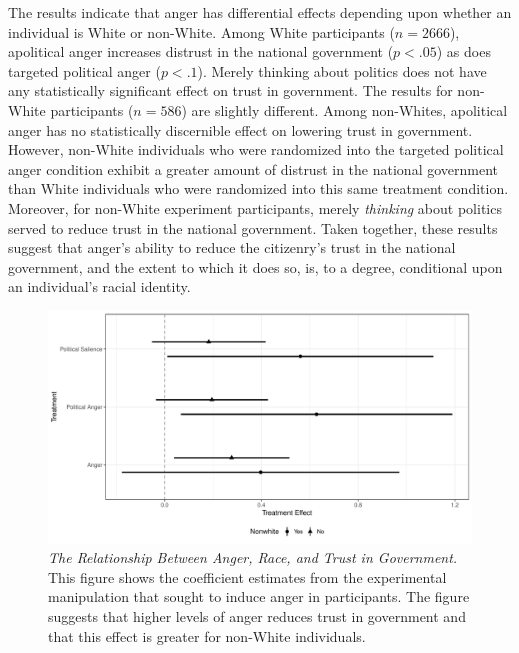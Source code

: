 \documentclass[12pt, letterpaper]{article}
\begin{document}
The results indicate that anger has differential effects depending upon whether an individual is White or non-White. Among White participants ($n=2666$), apolitical anger increases distrust in the national government ($p < .05$) as does targeted political anger ($p < .1$). Merely thinking about politics does not have any statistically significant effect on trust in government. The results for non-White participants ($n=586$) are slightly different. Among non-Whites, apolitical anger has no statistically discernible effect on lowering trust in government. However, non-White individuals who were randomized into the targeted political anger condition exhibit a greater amount of distrust in the national government than White individuals who were randomized into this same treatment condition. Moreover, for non-White experiment participants, merely \emph{thinking} about politics served to reduce trust in the national government. Taken together, these results suggest that anger's ability to reduce the citizenry's trust in the national government, and the extent to which it does so, is, to a degree, conditional upon an individual's racial identity.

\begin{center}
\begin{figure}
\includegraphics[width=\textwidth]{coefs}
\caption{\footnotesize\textit{The Relationship Between Anger, Race, and Trust in Government.} This figure shows the coefficient estimates from the experimental manipulation that sought to induce anger in participants. The figure suggests that higher levels of anger reduces trust in government and that this effect is greater for non-White individuals.}
\label{fig:coef_plot}
\end{figure}
\end{center}


\newpage
\begin{singlespacing}


\end{singlespacing}
\end{document}
